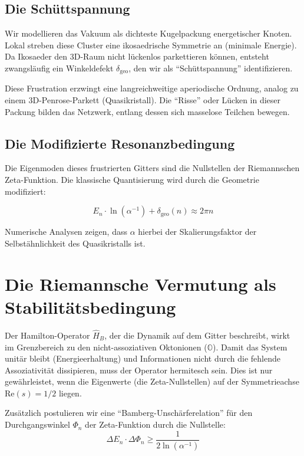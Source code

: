 \documentclass[11pt, a4paper]{article}
\begin{document}
	\subsection{Die Schüttspannung}
	Wir modellieren das Vakuum als dichteste Kugelpackung energetischer Knoten. Lokal streben diese Cluster eine ikosaedrische Symmetrie an (minimale Energie). Da Ikosaeder den 3D-Raum nicht lückenlos parkettieren können, entsteht zwangsläufig ein Winkeldefekt $\delta_{\text{geo}}$, den wir als "`Schüttspannung"' identifizieren.
	
	Diese Frustration erzwingt eine langreichweitige aperiodische Ordnung, analog zu einem 3D-Penrose-Parkett (Quasikristall). Die "`Risse"' oder Lücken in dieser Packung bilden das Netzwerk, entlang dessen sich masselose Teilchen bewegen.
	
	\subsection{Die Modifizierte Resonanzbedingung}
	Die Eigenmoden dieses frustrierten Gitters sind die Nullstellen der Riemannschen Zeta-Funktion. Die klassische Quantisierung wird durch die Geometrie modifiziert:
	
	\begin{equation}
		E_n \cdot \ln(\alpha^{-1}) + \delta_{\text{geo}}(n) \approx 2\pi n
	\end{equation}
	
	Numerische Analysen zeigen, dass $\alpha$ hierbei der Skalierungsfaktor der Selbstähnlichkeit des Quasikristalls ist.
	
	\section{Die Riemannsche Vermutung als Stabilitätsbedingung}
	
	Der Hamilton-Operator $\hat{H}_B$, der die Dynamik auf dem Gitter beschreibt, wirkt im Grenzbereich zu den nicht-assoziativen Oktonionen ($\mathbb{O}$). Damit das System unitär bleibt (Energieerhaltung) und Informationen nicht durch die fehlende Assoziativität dissipieren, muss der Operator hermitesch sein. Dies ist nur gewährleistet, wenn die Eigenwerte (die Zeta-Nullstellen) auf der Symmetrieachse $\text{Re}(s) = 1/2$ liegen.
	
	Zusätzlich postulieren wir eine "`Bamberg-Unschärferelation"' für den Durchgangswinkel $\Phi_n$ der Zeta-Funktion durch die Nullstelle:
	\begin{equation}
		\Delta E_n \cdot \Delta \Phi_n \ge \frac{1}{2 \ln(\alpha^{-1})}
	\end{equation}
	
\end{document}
